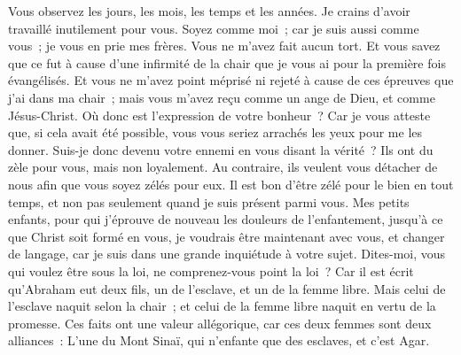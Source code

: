 \begin{multicols}{2}
Vous observez les jours, les mois, les temps et les années.
Je crains d'avoir travaillé inutilement pour vous.
Soyez comme moi~; car je suis aussi comme vous~; je vous en prie mes frères.
Vous ne m'avez fait aucun tort. Et vous savez que ce fut à cause d'une infirmité de la chair que je vous ai pour la première fois évangélisés.
Et vous ne m'avez point méprisé ni rejeté à cause de ces épreuves que j'ai dans ma chair~; mais vous m'avez reçu comme un ange de Dieu, et comme Jésus-Christ.
Où donc est l'expression de votre bonheur~? Car je vous atteste que, si cela avait été possible, vous vous seriez arrachés les yeux pour me les donner.
Suis-je donc devenu votre ennemi en vous disant la vérité~?
Ils ont du zèle pour vous, mais non loyalement. Au contraire, ils veulent vous détacher de nous afin que vous soyez zélés pour eux.
Il est bon d'être zélé pour le bien en tout temps, et non pas seulement quand je suis présent parmi vous.
Mes petits enfants, pour qui j'éprouve de nouveau les douleurs de l'enfantement, jusqu'à ce que Christ soit formé en vous,
je voudrais être maintenant avec vous, et changer de langage, car je suis dans une grande inquiétude à votre sujet.
Dites-moi, vous qui voulez être sous la loi, ne comprenez-vous point la loi~?
Car il est écrit qu'Abraham eut deux fils, un de l'esclave, et un de la femme libre.
Mais celui de l'esclave naquit selon la chair~; et celui de la femme libre naquit en vertu de la promesse.
Ces faits ont une valeur allégorique, car ces deux femmes sont deux alliances~: L'une du Mont Sinaï, qui n'enfante que des esclaves, et c'est Agar.

\end{multicols}
